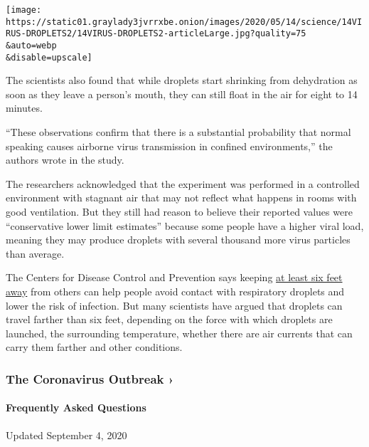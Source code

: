 \texttt{[image: https://static01.graylady3jvrrxbe.onion/images/2020/05/14/science/14VIRUS-DROPLETS2/14VIRUS-DROPLETS2-articleLarge.jpg?quality=75\\\&auto=webp\\\&disable=upscale]}

The scientists also found that while droplets start shrinking from
dehydration as soon as they leave a person's mouth, they can still float
in the air for eight to 14 minutes.

``These observations confirm that there is a substantial probability
that normal speaking causes airborne virus transmission in confined
environments,'' the authors wrote in the study.

The researchers acknowledged that the experiment was performed in a
controlled environment with stagnant air that may not reflect what
happens in rooms with good ventilation. But they still had reason to
believe their reported values were ``conservative lower limit
estimates'' because some people have a higher viral load, meaning they
may produce droplets with several thousand more virus particles than
average.

The Centers for Disease Control and Prevention says keeping
\href{https://www.nytimes3xbfgragh.onion/2020/04/14/health/coronavirus-six-feet.html}{at
least six feet away} from others can help people avoid contact with
respiratory droplets and lower the risk of infection. But many
scientists have argued that droplets can travel farther than six feet,
depending on the force with which droplets are launched, the surrounding
temperature, whether there are air currents that can carry them farther
and other conditions.

\href{https://www.nytimes3xbfgragh.onion/news-event/coronavirus?action=click\&pgtype=Article\&state=default\&region=MAIN_CONTENT_3\&context=storylines_faq}{}

\hypertarget{the-coronavirus-outbreak-}{%
\subsubsection{The Coronavirus Outbreak
›}\label{the-coronavirus-outbreak-}}

\hypertarget{frequently-asked-questions}{%
\paragraph{Frequently Asked
Questions}\label{frequently-asked-questions}}

Updated September 4, 2020

